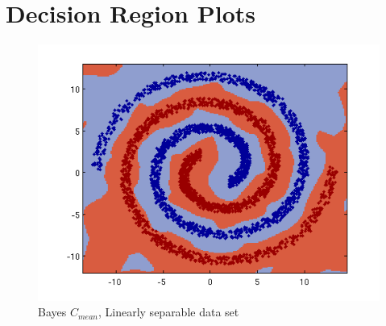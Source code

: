 \documentclass[a4paper]{article}
\begin{document}
\newpage

\section{Decision Region Plots}
\begin{figure}[h]
\center
\includegraphics[clip, trim=40px 15px 30px 10px]{gmm_nls_fullcov.png}
\caption{Bayes $C_{mean}$, Linearly separable data set}
\end{figure}
\end{document}
